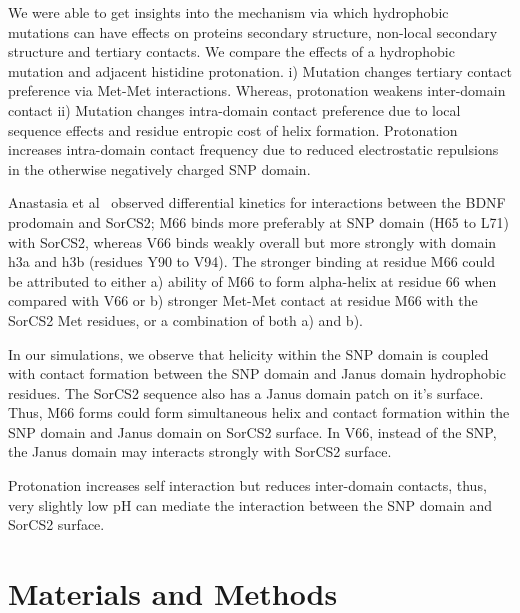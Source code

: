 \documentclass[journal=jacsat,manuscript=article]{achemso}
\begin{document}
We were able to get insights into the mechanism via which hydrophobic mutations can have effects on proteins secondary structure, non-local secondary structure and tertiary contacts. We compare the effects of a hydrophobic mutation and adjacent histidine protonation. i) Mutation changes tertiary contact preference via Met-Met interactions. Whereas, protonation weakens inter-domain contact ii) Mutation changes intra-domain contact preference due to local sequence effects and residue entropic cost of helix formation. Protonation increases intra-domain contact frequency due to reduced electrostatic repulsions in the otherwise negatively charged SNP domain.


Anastasia et al~\cite{Anastasia2013} observed differential kinetics for interactions between the BDNF prodomain and SorCS2; M66 binds more preferably at SNP domain (H65 to L71) with SorCS2, whereas V66 binds weakly overall but more strongly with domain h3a and h3b  (residues Y90 to V94). 
The stronger binding at residue M66 could be attributed to either a) ability of M66 to form alpha-helix at residue 66 when compared with V66 or b) stronger Met-Met contact at residue M66 with the SorCS2 Met residues, or a combination of both a) and b). 

In our simulations, we observe that helicity within the SNP domain is coupled with contact formation between the SNP domain and Janus domain hydrophobic residues. The SorCS2 sequence also has a Janus domain patch on it's surface. Thus, M66 forms could form simultaneous helix and contact formation within the SNP domain and Janus domain on SorCS2 surface. In V66, instead of the SNP, the Janus domain may interacts strongly with SorCS2 surface.

Protonation increases self interaction but reduces inter-domain contacts, thus, very slightly low pH can mediate the interaction between the SNP domain and SorCS2 surface. 

\section*{Materials and Methods}
\end{document}
